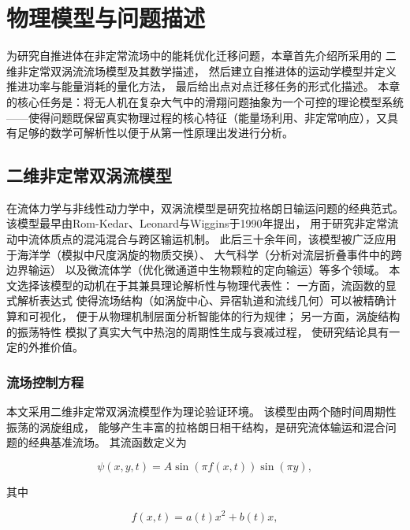 ﻿%

\chapter{物理模型与问题描述}

为研究自推进体在非定常流场中的能耗优化迁移问题，本章首先介绍所采用的
二维非定常双涡流流场模型及其数学描述，
然后建立自推进体的运动学模型并定义推进功率与能量消耗的量化方法，
最后给出点对点迁移任务的形式化描述。
本章的核心任务是：将无人机在复杂大气中的滑翔问题抽象为一个可控的理论模型系统——使得问题既保留真实物理过程的核心特征（能量场利用、非定常响应），又具有足够的数学可解析性以便于从第一性原理出发进行分析。


\section{二维非定常双涡流模型}

在流体力学与非线性动力学中，双涡流模型是研究拉格朗日输运问题的经典范式。
该模型最早由Rom-Kedar、Leonard与Wiggins于1990年提出，
用于研究非定常流动中流体质点的混沌混合与跨区输运机制\cite{rom-kedarAnalyticalStudyTransport1990}。
此后三十余年间，该模型被广泛应用于海洋学（模拟中尺度涡旋的物质交换）、
大气科学（分析对流层折叠事件中的跨边界输运）
以及微流体学（优化微通道中生物颗粒的定向输运）等多个领域。
本文选择该模型的动机在于其兼具理论解析性与物理代表性：
一方面，流函数的显式解析表达式
使得流场结构（如涡旋中心、异宿轨道和流线几何）可以被精确计算和可视化，
便于从物理机制层面分析智能体的行为规律；
另一方面，涡旋结构的振荡特性
模拟了真实大气中热泡的周期性生成与衰减过程，
使研究结论具有一定的外推价值。

\subsection{流场控制方程}

本文采用二维非定常双涡流模型作为理论验证环境。
该模型由两个随时间周期性振荡的涡旋组成，
能够产生丰富的拉格朗日相干结构，是研究流体输运和混合问题的经典基准流场。
其流函数定义为

\begin{equation}
    \psi(x, y, t) = A \sin(\pi f(x, t)) \sin(\pi y),
    \label{eq:stream_function}
\end{equation}

其中

\begin{equation}
    f(x, t) = a(t) x^2 + b(t) x,
    \label{eq:f_function}
\end{equation}

